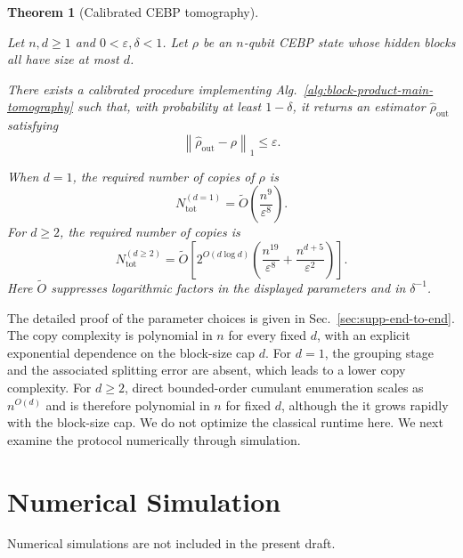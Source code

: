 \documentclass[
  aps,
  prx,
  reprint,
  superscriptaddress,
  amsmath,
  amssymb,
  nofootinbib,
  longbibliography
]{revtex4-2}
\newtheorem{theorem}{Theorem}
\begin{document}
\begin{theorem}[Calibrated CEBP tomography]
\label{thm:main-calibrated-cebp-tomography}

Let $n,d\ge1$ and $0<\varepsilon,\delta<1$. Let $\rho$ be an $n$-qubit CEBP
state whose hidden blocks all have size at most $d$.

There exists a calibrated procedure implementing
Alg.~\ref{alg:block-product-main-tomography} such that, with probability at
least $1-\delta$, it returns an estimator $\widehat\rho_{\mathrm{out}}$
satisfying
\begin{equation}
\left\|
\widehat\rho_{\mathrm{out}}-\rho
\right\|_1
\le
\varepsilon.
\end{equation}

When $d=1$, the required number of copies of $\rho$ is
\begin{equation}
N_{\mathrm{tot}}^{(d=1)}
=
\widetilde O\!\left(
\frac{n^9}{\varepsilon^8}
\right).
\label{eq:main-calibrated-d-one-copies}
\end{equation}
For $d\ge2$, the required number of copies is
\begin{equation}
N_{\mathrm{tot}}^{(d\ge2)}
=
\widetilde O\!\left[
2^{O(d\log d)}
\left(
\frac{n^{19}}{\varepsilon^8}
+
\frac{n^{d+5}}{\varepsilon^2}
\right)
\right].
\label{eq:main-calibrated-d-ge-two-copies}
\end{equation}
Here $\widetilde O$ suppresses logarithmic factors in the displayed parameters
and in $\delta^{-1}$.

\end{theorem}

The detailed proof of the parameter choices is given in
Sec.~\ref{sec:supp-end-to-end}. The copy complexity is polynomial in $n$ for
every fixed $d$, with an explicit exponential dependence on the block-size cap
$d$. For $d=1$, the grouping stage and the associated splitting error are absent,
which leads to a lower copy complexity. For $d\ge2$, direct
bounded-order cumulant enumeration scales as $n^{O(d)}$ and is therefore
polynomial in $n$ for fixed $d$, although the it grows rapidly with the
block-size cap. We do not optimize the classical runtime here. We next examine
the protocol numerically through simulation.

\section{Numerical Simulation}

Numerical simulations are not included in the present draft.
\end{document}
